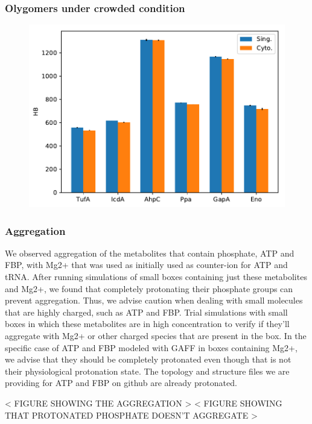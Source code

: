 \documentclass[journal=jacsat,manuscript=article]{achemso}
\begin{document}
\subsubsection{Olygomers under crowded condition}
\begin{figure}
\includegraphics[scale=0.6]{hb.pdf}
\end{figure}


\subsubsection{Aggregation}
We observed aggregation of the metabolites that contain phosphate, ATP and FBP, with Mg2+ that was used as initially used as counter-ion for ATP and tRNA. After running simulations of small boxes containing just these metabolites and Mg2+, we found that completely protonating their phosphate groups can prevent aggregation. Thus, we advise caution when dealing with small molecules that are highly charged, such as ATP and FBP. Trial simulations with small boxes in which these metabolites are in high concentration to verify if they'll aggregate with Mg2+ or other charged species that are present in the box. In the specific case of ATP and FBP modeled with GAFF in boxes containing Mg2+, we advise that they should be completely protonated even though that is not their physiological protonation state. The topology and structure files we are providing for ATP and FBP on github are already protonated.

< FIGURE SHOWING THE AGGREGATION >
< FIGURE SHOWING THAT PROTONATED PHOSPHATE DOESN'T AGGREGATE >
\end{document}
